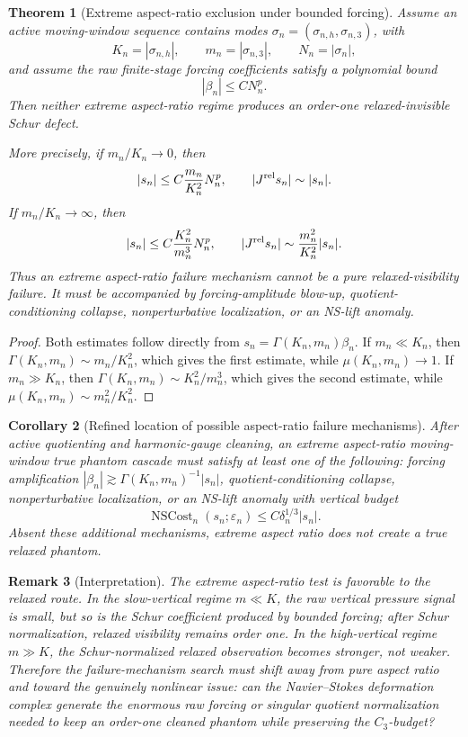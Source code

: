 \documentclass[11pt]{article}
\numberwithin{equation}{section}
\newtheorem{theorem}{Theorem}[section]
\newtheorem{corollary}[theorem]{Corollary}
\newtheorem{remark}[theorem]{Remark}
\newcommand{\eps}{\varepsilon}
\begin{document}
\begin{theorem}[Extreme aspect-ratio exclusion under bounded forcing]\label{thm:extreme-aspect-ratio-exclusion-bounded-forcing}
Assume an active moving-window sequence contains modes \(\sigma_n=(\sigma_{n,h},\sigma_{n,3})\), with
\[
        K_n=|\sigma_{n,h}|,
        \qquad
        m_n=|\sigma_{n,3}|,
        \qquad
        N_n=|\sigma_n|,
\]
and assume the raw finite-stage forcing coefficients satisfy a polynomial bound
\[
        |\beta_n|\le C N_n^p.
\]
Then neither extreme aspect-ratio regime produces an order-one relaxed-invisible Schur defect.

More precisely, if \(m_n/K_n\to0\), then
\[
        |s_n|\le C\frac{m_n}{K_n^2}N_n^p,
        \qquad
        |J^{\rm rel}s_n|\sim |s_n|.
\]
If \(m_n/K_n\to\infty\), then
\[
        |s_n|\le C\frac{K_n^2}{m_n^3}N_n^p,
        \qquad
        |J^{\rm rel}s_n|\sim \frac{m_n^2}{K_n^2}|s_n|.
\]
Thus an extreme aspect-ratio failure mechanism cannot be a pure relaxed-visibility failure.  It must be accompanied by forcing-amplitude blow-up, quotient-conditioning collapse, nonperturbative localization, or an NS-lift anomaly.
\end{theorem}

\begin{proof}
Both estimates follow directly from \(s_n=\Gamma(K_n,m_n)\beta_n\).  If \(m_n\ll K_n\), then \(\Gamma(K_n,m_n)\sim m_n/K_n^2\), which gives the first estimate, while \(\mu(K_n,m_n)\to1\).  If \(m_n\gg K_n\), then \(\Gamma(K_n,m_n)\sim K_n^2/m_n^3\), which gives the second estimate, while \(\mu(K_n,m_n)\sim m_n^2/K_n^2\).
\end{proof}

\begin{corollary}[Refined location of possible aspect-ratio failure mechanisms]\label{cor:refined-location-aspect-failures}
After active quotienting and harmonic-gauge cleaning, an extreme aspect-ratio moving-window true phantom cascade must satisfy at least one of the following: forcing amplification \(|\beta_n|\gtrsim \Gamma(K_n,m_n)^{-1}|s_n|\), quotient-conditioning collapse, nonperturbative localization, or an NS-lift anomaly with vertical budget
\[
        \operatorname{NSCost}_n(s_n;\eps_n)
        \le
        C\delta_n^{1/3}|s_n|.
\]
Absent these additional mechanisms, extreme aspect ratio does not create a true relaxed phantom.
\end{corollary}

\begin{remark}[Interpretation]
The extreme aspect-ratio test is favorable to the relaxed route.  In the slow-vertical regime \(m\ll K\), the raw vertical pressure signal is small, but so is the Schur coefficient produced by bounded forcing; after Schur normalization, relaxed visibility remains order one.  In the high-vertical regime \(m\gg K\), the Schur-normalized relaxed observation becomes stronger, not weaker.  Therefore the failure-mechanism search must shift away from pure aspect ratio and toward the genuinely nonlinear issue: can the Navier--Stokes deformation complex generate the enormous raw forcing or singular quotient normalization needed to keep an order-one cleaned phantom while preserving the \(C_3\)-budget?
\end{remark}
\end{document}
